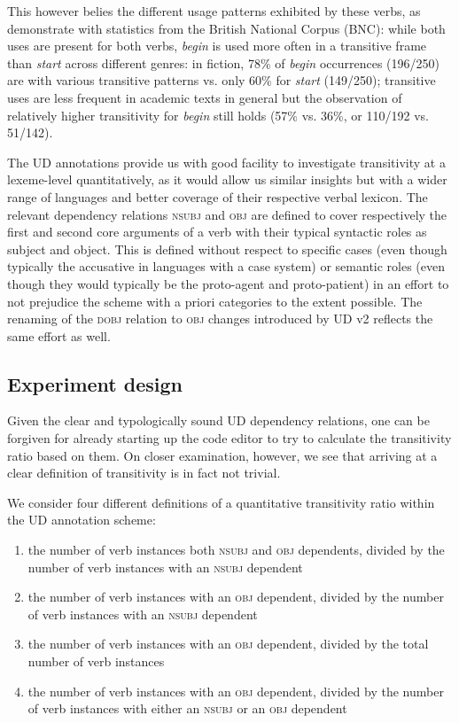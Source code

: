 This however belies the different usage patterns exhibited by these verbs, as \citet[95]{biber1998} demonstrate with statistics from the British National Corpus (BNC): while both uses are present for both verbs, \textit{begin} is used more often in a transitive frame than \textit{start} across different genres: in fiction, 78\% of \textit{begin} occurrences (196/250) are with various transitive patterns vs. only 60\% for \textit{start} (149/250); transitive uses are less frequent in academic texts in general but the observation of relatively higher transitivity for \textit{begin} still holds (57\% vs. 36\%, or 110/192 vs. 51/142).

The UD annotations provide us with good facility to investigate transitivity at a lexeme-level quantitatively, as it would allow us similar insights but with a wider range of languages and better coverage of their respective verbal lexicon. The relevant dependency relations \textsc{nsubj} and \textsc{obj} are defined to cover respectively the first and second core arguments of a verb with their typical syntactic roles as subject and object. This is defined without respect to specific cases (even though typically the accusative in languages with a case system) or semantic roles (even though they would typically be the proto-agent and proto-patient) in an effort to not prejudice the scheme with a priori categories to the extent possible. The renaming of the \textsc{dobj} relation to \textsc{obj} changes introduced by UD v2 \citep{nivre2020} reflects the same effort as well.

\subsection{Experiment design}

Given the clear and typologically sound UD dependency relations, one can be forgiven for already starting up the code editor to try to calculate the transitivity ratio based on them. On closer examination, however, we see that arriving at a clear definition of transitivity is in fact not trivial.

We consider four different definitions of a quantitative transitivity ratio within the UD annotation scheme:

\begin{enumerate}
    \item the number of verb instances both \textsc{nsubj} and \textsc{obj} dependents, divided by the number of verb instances with an \textsc{nsubj} dependent
    \item the number of verb instances with an \textsc{obj} dependent, divided by the number of verb instances with an \textsc{nsubj} dependent
    \item the number of verb instances with an \textsc{obj} dependent, divided by the total number of verb instances
    \item the number of verb instances with an \textsc{obj} dependent, divided by the number of verb instances with either an \textsc{nsubj} or an \textsc{obj} dependent
\end{enumerate}

